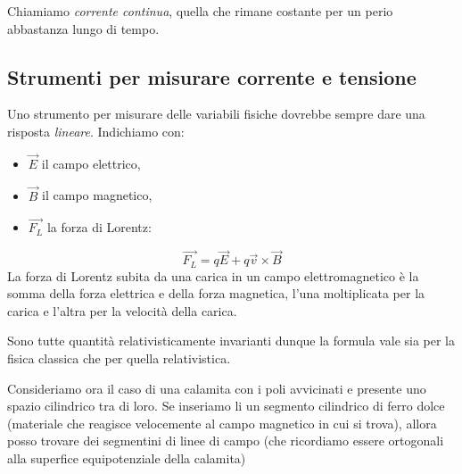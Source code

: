 \documentclass{article}
\begin{document}
Chiamiamo \textit{corrente continua}, quella che rimane costante per un perio abbastanza lungo di tempo. 
\pagebreak
\subsection{Strumenti per misurare corrente e tensione}
Uno strumento per misurare delle variabili fisiche dovrebbe sempre dare una risposta \textit{lineare}.
Indichiamo con:
\begin{itemize}
\item $\vec{E}$ il campo elettrico,
\item $\vec{B}$ il campo magnetico,
\item $\vec{F_L}$ la forza di Lorentz:
\end{itemize} 
\[
\vec{F_L} = q \vec{E} + q \vec{v} \times \vec{B}
\]
La forza di Lorentz subita da una carica in un campo elettromagnetico è la somma della forza elettrica e della forza magnetica, l'una moltiplicata per la carica e l'altra per la velocità della carica.

Sono tutte quantità relativisticamente invarianti dunque la formula vale sia per la fisica classica che per quella relativistica.

Consideriamo ora il caso di una calamita con i poli avvicinati e presente uno spazio cilindrico tra di loro. Se inseriamo li un segmento cilindrico di ferro dolce (materiale che reagisce velocemente al campo magnetico in cui si trova), allora posso trovare dei segmentini di linee di campo (che ricordiamo essere
ortogonali alla superfice equipotenziale della calamita) 

\begin{center}
\end{center}
\end{document}
